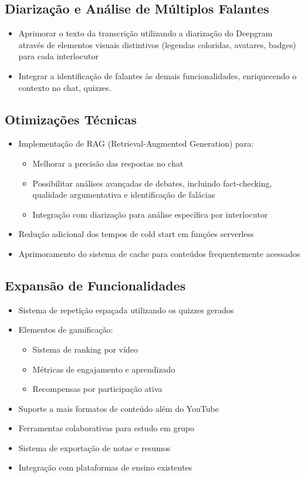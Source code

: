 \documentclass[tcc,capa]{texufpel}
\begin{document}
\subsection{Diarização e Análise de Múltiplos Falantes}

\begin{itemize}
  \item Aprimorar o texto da transcrição utilizando a diarização do Deepgram através de elementos visuais distintivos (legendas coloridas, avatares, badges) para cada interlocutor
  \item Integrar a identificação de falantes às demais funcionalidades, enriquecendo o contexto no chat, quizzes.
\end{itemize}


\subsection{Otimizações Técnicas}
\begin{itemize}
    \item Implementação de RAG (Retrieval-Augmented Generation) para:
        \begin{itemize}
            \item Melhorar a precisão das respostas no chat
            \item Possibilitar análises avançadas de debates, incluindo fact-checking, qualidade argumentativa e identificação de falácias
            \item Integração com diarização para análise específica por interlocutor
        \end{itemize}
    \item Redução adicional dos tempos de cold start em funções serverless
    \item Aprimoramento do sistema de cache para conteúdos frequentemente acessados
\end{itemize}

\subsection{Expansão de Funcionalidades}
\begin{itemize}
    \item Sistema de repetição espaçada utilizando os quizzes gerados
    \item Elementos de gamificação:
        \begin{itemize}
            \item Sistema de ranking por vídeo
            \item Métricas de engajamento e aprendizado
            \item Recompensas por participação ativa
        \end{itemize}
    \item Suporte a mais formatos de conteúdo além do YouTube
    \item Ferramentas colaborativas para estudo em grupo
    \item Sistema de exportação de notas e resumos
    \item Integração com plataformas de ensino existentes
\end{itemize}
\end{document}
